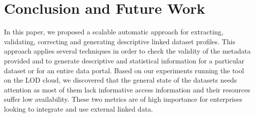 \documentclass[runningheads,a4paper]{llncs}
\begin{document}



\section{Conclusion and Future Work}
\label{sec:conclusion}

In this paper, we proposed a scalable automatic approach for extracting, validating, correcting and generating descriptive linked dataset profiles. This approach applies several techniques in order to check the validity of the metadata provided and to generate descriptive and statistical information for a particular dataset or for an entire data portal. Based on our experiments running the tool on the LOD cloud, we discovered that the general state of the datasets needs attention as most of them lack informative access information and their resources suffer low availability. These two metrics are of high importance for enterprises looking to integrate and use external linked data.
\end{document}
